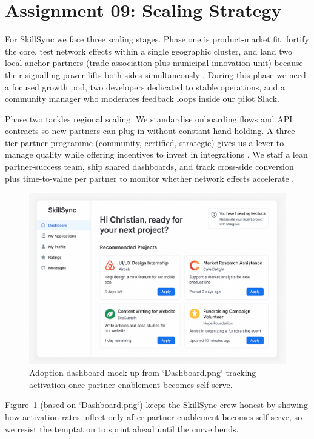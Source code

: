 \section*{Assignment 09: Scaling Strategy}

For SkillSync we face three scaling stages. Phase one is product-market fit: fortify the core, test network effects within a single geographic cluster, and land two local anchor partners (trade association plus municipal innovation unit) because their signalling power lifts both sides simultaneously \citep{Choudary2016,Reillier2017}. During this phase we need a focused growth pod, two developers dedicated to stable operations, and a community manager who moderates feedback loops inside our pilot Slack.

Phase two tackles regional scaling. We standardise onboarding flows and API contracts so new partners can plug in without constant hand-holding. A three-tier partner programme (community, certified, strategic) gives us a lever to manage quality while offering incentives to invest in integrations \citep{HagiuWright2013}. We staff a lean partner-success team, ship shared dashboards, and track cross-side conversion plus time-to-value per partner to monitor whether network effects accelerate \citep{ShapiroVarian1999}.

\begin{figure}[h]
  \centering
  \includegraphics[width=0.75\linewidth]{figures/Dashboard.png}
  \caption{Adoption dashboard mock-up from `Dashboard.png` tracking activation once partner enablement becomes self-serve.}
  \label{fig:scaling-dashboard}
\end{figure}

Figure~\ref{fig:scaling-dashboard} (based on `Dashboard.png`) keeps the SkillSync crew honest by showing how activation rates inflect only after partner enablement becomes self-serve, so we resist the temptation to sprint ahead until the curve bends.

